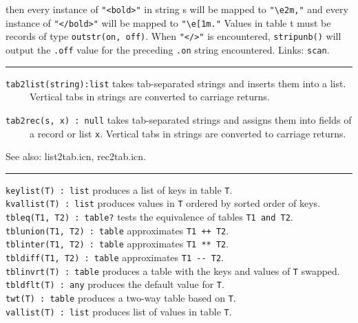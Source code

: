 \iconcode{
key: "bold" value:
outstr("{\textbackslash}e[2m",
"{\textbackslash}e1m") \\
key: "underline" value:
outstr("{\textbackslash}e[4m",
"{\textbackslash}e1m") etc.}

\noindent then every instance of
\texttt{"{\textless}bold{\textgreater}"} in
string s will be mapped to
\texttt{"{\textbackslash}e2m,"} and every
instance of
\texttt{"{\textless}/bold{\textgreater}"}
will be mapped to
\texttt{"{\textbackslash}e[1m."} Values in
table t must be records of type \texttt{outstr(on, off)}. When
\texttt{"{\textless}/{\textgreater}"} is
encountered, \texttt{stripunb()} will output the \texttt{.off} value
for the preceding \texttt{.on} string encountered.
Links: \texttt{scan}.

\vspace{0.25cm}\hrule{}

\texttt{tab2list(string):list} takes tab-separated strings and inserts
them into a list.\\
 \ \ \ \ \ Vertical tabs in strings are converted to carriage returns.

\texttt{tab2rec(s, x) : null} takes tab-separated strings and assigns
them into fields of\\
 \ \ \ \ \ a record or list \texttt{x}. Vertical tabs in strings are
converted to carriage returns.

See also: list2tab.icn, rec2tab.icn. 

\vspace{0.25cm}\hrule{}

\texttt{keylist(T) : list} produces a list of keys in table
\texttt{T}.\\
\texttt{kvallist(T) : list} produces values in \texttt{T} ordered by
sorted order of keys.\\
\texttt{tbleq(T1, T2) : table?} tests the equivalence of tables
\texttt{T1 and T2}.\\
\texttt{tblunion(T1, T2) : table} approximates \texttt{T1 ++
T2}.\\
\texttt{tblinter(T1, T2) : table} approximates \texttt{T1 **
T2}.\\
\texttt{tbldiff(T1, T2) : table} approximates \texttt{T1 -{}-
T2}.\\
\texttt{tblinvrt(T) : table} produces a table with the keys and values
of \texttt{T} swapped.\\
\texttt{tbldflt(T) : any} produces the default value for
\texttt{T}.\\
\texttt{twt(T) : table} produces a two-way table
based on \texttt{T}.\\
\texttt{vallist(T) : list} produces list of values in table \texttt{T}.

